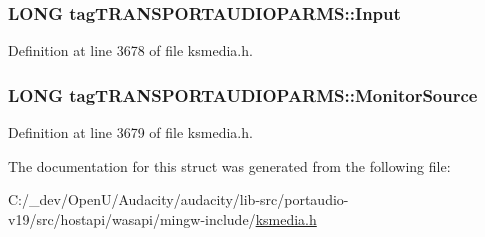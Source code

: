 \subsubsection[{\texorpdfstring{Input}{Input}}]{\setlength{\rightskip}{0pt plus 5cm}L\+O\+NG tag\+T\+R\+A\+N\+S\+P\+O\+R\+T\+A\+U\+D\+I\+O\+P\+A\+R\+M\+S\+::\+Input}\hypertarget{structtag_t_r_a_n_s_p_o_r_t_a_u_d_i_o_p_a_r_m_s_a9c4539e21e89b4e240ca73de649d3123}{}\label{structtag_t_r_a_n_s_p_o_r_t_a_u_d_i_o_p_a_r_m_s_a9c4539e21e89b4e240ca73de649d3123}


Definition at line 3678 of file ksmedia.\+h.

\subsubsection[{\texorpdfstring{Monitor\+Source}{MonitorSource}}]{\setlength{\rightskip}{0pt plus 5cm}L\+O\+NG tag\+T\+R\+A\+N\+S\+P\+O\+R\+T\+A\+U\+D\+I\+O\+P\+A\+R\+M\+S\+::\+Monitor\+Source}\hypertarget{structtag_t_r_a_n_s_p_o_r_t_a_u_d_i_o_p_a_r_m_s_a5702b464a277175e2db4831bc9399684}{}\label{structtag_t_r_a_n_s_p_o_r_t_a_u_d_i_o_p_a_r_m_s_a5702b464a277175e2db4831bc9399684}


Definition at line 3679 of file ksmedia.\+h.



The documentation for this struct was generated from the following file\+:\begin{DoxyCompactItemize}
\item 
C\+:/\+\_\+dev/\+Open\+U/\+Audacity/audacity/lib-\/src/portaudio-\/v19/src/hostapi/wasapi/mingw-\/include/\hyperlink{ksmedia_8h}{ksmedia.\+h}\end{DoxyCompactItemize}
